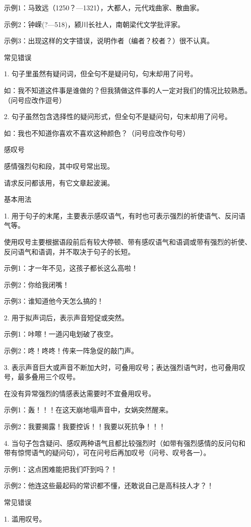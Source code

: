 示例1：马致远（1250？—1321），大都人，元代戏曲家、散曲家。

示例2：钟嵘(?—518)，颍川长社人，南朝梁代文学批评家。

示例3：出现这样的文字错误，说明作者（编者？校者？）很不认真。

常见错误

1. 句子里虽然有疑问词，但全句不是疑问句，句末却用了问号。

如：我不知道这件事是谁做的？但我猜做这件事的人一定对我们的情况比较熟悉。（问号应改作逗号）

2. 句子虽然包含选择性的疑问形式，但全句不是疑问句，句末却用了问号。

如：我也不知道你喜欢不喜欢这种颜色？（问号应改作句号）

感叹号

感情强烈句和段，其中叹号常出现。

请求反问都该用，有它文章起波澜。

基本用法

1. 用于句子的末尾，主要表示感叹语气，有时也可表示强烈的祈使语气、反问语气等。

使用叹号主要根据语段前后有较大停顿、带有感叹语气和语调或带有强烈的祈使、反问语气和语调，并不取决于句子的长短。

示例1：才一年不见，这孩子都长这么高啦！

示例2：你给我闭嘴！

示例3：谁知道他今天怎么搞的！

2. 用于拟声词后，表示声音短促或突然。

示例1：咔嚓！一道闪电划破了夜空。

示例2：咚！咚咚！传来一阵急促的敲门声。

3. 表示声音巨大或声音不断加大时，可叠用叹号；表达强烈语气时，也可叠用叹号，最多叠用三个叹号。

在没有异常强烈的情感表达需要时不宜叠用叹号。

示例1：轰！！！在这天崩地塌声音中，女娲突然醒来。

示例2：我要揭露！我要控诉！！我要以死抗争！！！

4. 当句子包含疑问、感叹两种语气且都比较强烈时（如带有强烈感情的反问句和带有惊愕语气的疑问句），可在问号后再加叹号（问号、叹号各一）。

示例1：这点困难能把我们吓到吗？！

示例2：他连这些最起码的常识都不懂，还敢说自己是高科技人才？！

常见错误

1. 滥用叹号。

